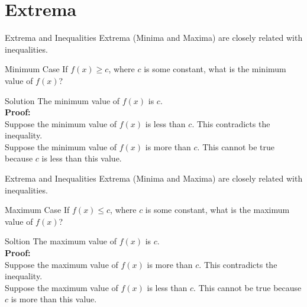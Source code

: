 \section{Extrema}
\begin{namedframe}{Extrema and Inequalities}
	Extrema (Minima and Maxima) are closely related with inequalities.
	\begin{exampleblock}{Minimum Case}
		If $f(x) \geq c$, where $c$ is some constant, what is the minimum value of $f(x)$?
	\end{exampleblock}
	\pause
	\begin{block}{Solution}
		The minimum value of $f(x)$ is $c$. \\
		\textbf{Proof:} \\
		Suppose the minimum value of $f(x)$ is less than $c$. This contradicts the inequality. \\
		Suppose the minimum value of $f(x)$ is more than $c$. This cannot be true because $c$ is less than this value.
	\end{block}
\end{namedframe}

\begin{namedframe}{Extrema and Inequalities}
	Extrema (Minima and Maxima) are closely related with inequalities.
	\begin{exampleblock}{Maximum Case}
		If $f(x) \leq c$, where $c$ is some constant, what is the maximum value of $f(x)$?
	\end{exampleblock}
	\pause
	\begin{block}{Soltion}
		The maximum value of $f(x)$ is $c$. \\
		\textbf{Proof:} \\
		Suppose the maximum value of $f(x)$ is more than $c$. This contradicts the inequality. \\
		Suppose the maximum value of $f(x)$ is less than $c$. This cannot be true because $c$ is more than this value.
	\end{block}
\end{namedframe}
